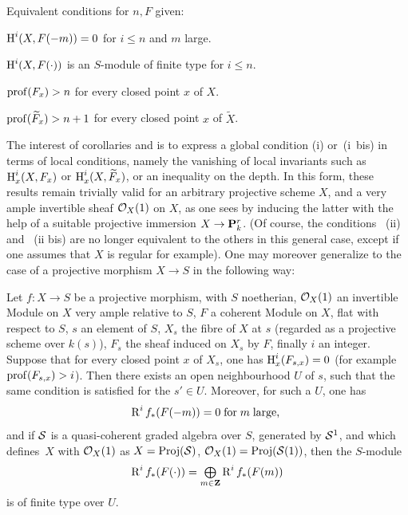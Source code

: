 \begin{corollary} \label{XII.1.4}
Equivalent conditions for $n, F$ given:
\begin{enumeratei}
\item
$\operatorname{H}^i(X, F(-m))=0$ for $i\leq n$ and $m$ large.
\item[\textup{(i bis)}] $\operatorname{H}^i(X, F(\cdot))$ is an $S$-module of finite type for $i\leq n$.
\item
$\operatorname{prof}(F_x)>n$ for every closed point $x$ of $X$.
\item
$\operatorname{prof}(\widetilde{F}_x)>n+1$ for every closed point $x$ of $\widetilde{X}$.
\end{enumeratei}
\end{corollary}

The interest of corollaries  and  is to express a global condition (i) or~(i~bis) in terms of local conditions, namely the vanishing of local invariants such as $\operatorname{H}_x^i(X, F_x)$ or $\operatorname{H}_x^i(X, \widetilde{F}_x)$, or an inequality on the depth. In this form, these results remain trivially valid for an arbitrary projective scheme $X$, and a very ample invertible sheaf $\mathcal{O}_X(1)$ on $X$, as one sees by inducing the latter with the help of a suitable projective immersion $X\to\PP_k^r$. (Of course, the conditions ~(ii) and ~(ii bis) are no longer equivalent to the others in this general case, except if one assumes that $X$ is regular for example). One may moreover generalize to the case of a projective morphism $X\to S$ in the following way:

\begin{proposition} \label{XII.1.5}
Let $f:X\to S$ be a projective morphism, with $S$ noetherian, $\mathcal{O}_X(1)$ an invertible Module on $X$ very ample relative to $S$, $F$ a coherent Module on $X$, flat with respect to $S$, $s$ an element of $S$, $X_s$ the fibre of $X$ at $s$ (regarded as a projective scheme over $k(s)$), $F_s$ the sheaf induced on $X_s$ by $F$, finally $i$ an integer. Suppose that for every closed point $x$ of $X_s$, one has $\operatorname{H}^i_x(F_{s, x})=0$ (for example $\operatorname{prof}(F_{s, x})>i$). Then there exists an open neighbourhood $U$ of $s$, such that the same condition is satisfied for the $s'\in U$. Moreover, for such a $U$, one has
\[
\operatorname{R}^if_\ast(F(-m))= 0 \; \text{for}\; m \; \text{large, }
\]
and if ${\mathcal S}$ is a quasi-coherent graded algebra over $S$, generated by ${\mathcal S}^1$, and which defines~$X$ with $\mathcal{O}_X(1)$ as $X=\operatorname{Proj}({\mathcal S})$, $\mathcal{O}_X(1)=\operatorname{Proj}({\mathcal S}(1))$, then the $S$-module
\[
\operatorname{R}^if_\ast(F(\cdot)) = \mathop{\textstyle\bigoplus}\limits_{m\in\mathbf{Z}}\operatorname{R}^if_\ast(F(m))
\]
is of finite type over $U$.
\end{proposition}

